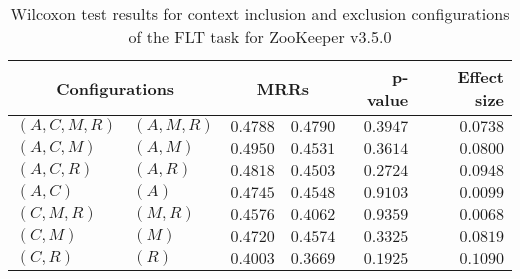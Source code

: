 
\begin{table}
\begin{spacing}{1.2}
\centering
\caption{Wilcoxon test results for context inclusion and exclusion configurations of the FLT task for ZooKeeper v3.5.0}
\label{table:versus-wilcox-zookeeper-flt-context}
\begin{tabular}{ll|rr|rr}
\toprule
      \multicolumn{2}{c|}{Configurations} &          \multicolumn{2}{c|}{MRRs} &       p-value & Effect size \\
\midrule
 $(A,C,M,R)$ &  $(A,M,R)$ & $0.4788$ & $0.4790$ & $0.3947$ &    $0.0738$ \\
   $(A,C,M)$ &    $(A,M)$ & $0.4950$ & $0.4531$ & $0.3614$ &    $0.0800$ \\
   $(A,C,R)$ &    $(A,R)$ & $0.4818$ & $0.4503$ & $0.2724$ &    $0.0948$ \\
     $(A,C)$ &      $(A)$ & $0.4745$ & $0.4548$ & $0.9103$ &    $0.0099$ \\
   $(C,M,R)$ &    $(M,R)$ & $0.4576$ & $0.4062$ & $0.9359$ &    $0.0068$ \\
     $(C,M)$ &      $(M)$ & $0.4720$ & $0.4574$ & $0.3325$ &    $0.0819$ \\
     $(C,R)$ &      $(R)$ & $0.4003$ & $0.3669$ & $0.1925$ &    $0.1090$ \\
\bottomrule
\end{tabular}

\end{spacing}
\end{table}

